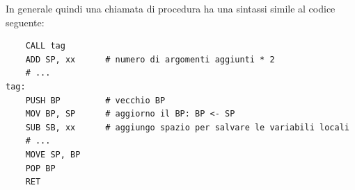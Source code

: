 \documentclass{article}
\numberwithin{equation}{subsection}
\begin{document}
In generale quindi una chiamata di procedura ha una sintassi simile al codice seguente:
\begin{verbatim}
    CALL tag
    ADD SP, xx      # numero di argomenti aggiunti * 2
    # ...
tag:
    PUSH BP         # vecchio BP
    MOV BP, SP      # aggiorno il BP: BP <- SP
    SUB SB, xx      # aggiungo spazio per salvare le variabili locali
    # ...
    MOVE SP, BP
    POP BP
    RET
\end{verbatim}
\end{document}
